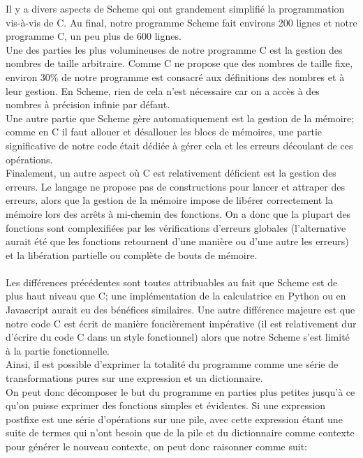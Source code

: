 \documentclass[titlepage, 12pt]{article}
\begin{document}
Il y a divers aspects de Scheme qui ont grandement simplifié la programmation vis-à-vis de C. Au final, notre programme Scheme fait environs 200 lignes et notre programme C, un peu plus de 600 lignes.\\
Une des parties les plus volumineuses de notre programme C est la gestion des nombres de taille arbitraire. Comme C ne propose que des nombres de taille fixe, environ 30\% de notre programme est consacré aux définitions des nombres et à leur gestion. En Scheme, rien de cela n'est nécessaire car on a accès à des nombres à précision infinie par défaut.\\
Une autre partie que Scheme gère automatiquement est la gestion de la mémoire; comme en C il faut allouer et désallouer les blocs de mémoires, une partie significative de notre code était dédiée à gérer cela et les erreurs découlant de ces opérations.\\
Finalement, un autre aspect où C est relativement déficient est la gestion des erreurs. Le langage ne propose pas de constructions pour lancer et attraper des erreurs, alors que la gestion de la mémoire impose de libérer correctement la mémoire lors des arrêts à mi-chemin des fonctions. On a donc que la plupart des fonctions sont complexifiées par les vérifications d'erreurs globales (l'alternative aurait été que les fonctions retournent d'une manière ou d'une autre les erreurs) et la libération partielle ou complète de bouts de mémoire.\\
\\
Les différences précédentes sont toutes attribuables au fait que Scheme est de plus haut niveau que C; une implémentation de la calculatrice en Python ou en Javascript aurait eu des bénéfices similaires. Une autre différence majeure est que notre code C est écrit de manière foncièrement impérative (il est relativement dur d'écrire du code C dans un style fonctionnel) alors que notre Scheme s'est limité à la partie fonctionnelle.\\
Ainsi, il est possible d'exprimer la totalité du programme comme une série de transformations pures sur une expression et un dictionnaire.\\
On peut donc décomposer le but du programme en parties plus petites jusqu'à ce qu'on puisse exprimer des fonctions simples et évidentes. Si une expression postfixe est une série d'opérations sur une pile, avec cette expression étant une suite de termes qui n'ont besoin que de la pile et du dictionnaire comme contexte pour générer le nouveau contexte, on peut donc raisonner comme suit:\\
\end{document}
